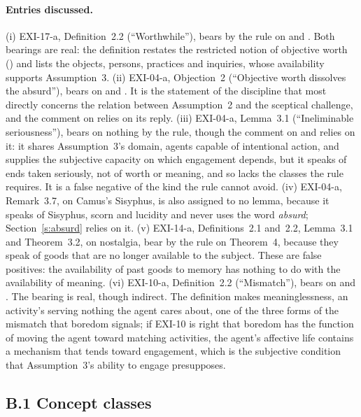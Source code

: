 \paragraph{Entries discussed.} (i) EXI-17-a, Definition~2.2 (\enquote{Worthwhile}), bears by the rule on  and . Both bearings are real: the definition restates the restricted notion of objective worth () and lists the objects, persons, practices and inquiries, whose availability supports Assumption~3. (ii) EXI-04-a, Objection~2 (\enquote{Objective worth dissolves the absurd}), bears on  and . It is the statement of the discipline that most directly concerns the relation between Assumption~2 and the sceptical challenge, and the comment on  relies on its reply. (iii) EXI-04-a, Lemma~3.1 (\enquote{Ineliminable seriousness}), bears on nothing by the rule, though the comment on  and  relies on it: it shares Assumption~3's domain, agents capable of intentional action, and supplies the subjective capacity on which engagement depends, but it speaks of ends taken seriously, not of worth or meaning, and so lacks the classes the rule requires. It is a false negative of the kind the rule cannot avoid. (iv) EXI-04-a, Remark~3.7, on Camus's Sisyphus, is also assigned to no lemma, because it speaks of Sisyphus, scorn and lucidity and never uses the word \emph{absurd}; Section~\ref{s:absurd} relies on it. (v) EXI-14-a, Definitions~2.1 and~2.2, Lemma~3.1 and Theorem~3.2, on nostalgia, bear by the rule on Theorem~4, because they speak of goods that are no longer available to the subject. These are false positives: the availability of past goods to memory has nothing to do with the availability of meaning. (vi) EXI-10-a, Definition~2.2 (\enquote{Mismatch}), bears on  and . The bearing is real, though indirect. The definition makes meaninglessness, an activity's serving nothing the agent cares about, one of the three forms of the mismatch that boredom signals; if EXI-10 is right that boredom has the function of moving the agent toward matching activities, the agent's affective life contains a mechanism that tends toward engagement, which is the subjective condition that Assumption~3's ability to engage presupposes.

\subsection*{B.1 Concept classes}

{\footnotesize\par}

